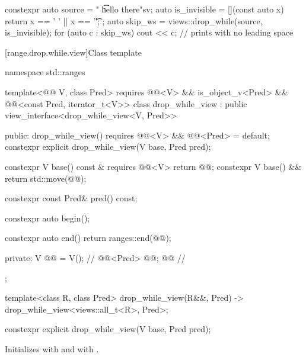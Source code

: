 \pnum
\begin{example}
\begin{codeblock}
constexpr auto source = "  \t   \t   \t   hello there"sv;
auto is_invisible = [](const auto x) { return x == ' ' || x == '\t'; };
auto skip_ws = views::drop_while(source, is_invisible);
for (auto c : skip_ws) {
  cout << c;                                    // prints  with no leading space
}
\end{codeblock}
\end{example}

[range.drop.while.view]{Class template }

%
%
%
\begin{codeblock}
namespace std::ranges {
  template<@@ V, class Pred>
    requires @@<V> && is_object_v<Pred> &&
             @@<const Pred, iterator_t<V>>
  class drop_while_view : public view_interface<drop_while_view<V, Pred>> {
  public:
    drop_while_view() requires @@<V> && @@<Pred> = default;
    constexpr explicit drop_while_view(V base, Pred pred);

    constexpr V base() const & requires @@<V> { return @@; }
    constexpr V base() && { return std::move(@@); }

    constexpr const Pred& pred() const;

    constexpr auto begin();

    constexpr auto end() { return ranges::end(@@); }

  private:
    V @@ = V();                                      // \expos
    @@<Pred> @@; @\itcorr[-1]@                           // \expos
  };

  template<class R, class Pred>
    drop_while_view(R&&, Pred) -> drop_while_view<views::all_t<R>, Pred>;
}
\end{codeblock}

%
\begin{itemdecl}
constexpr explicit drop_while_view(V base, Pred pred);
\end{itemdecl}

\begin{itemdescr}
\pnum
\effects
Initializes  with  and
 with .
\end{itemdescr}


